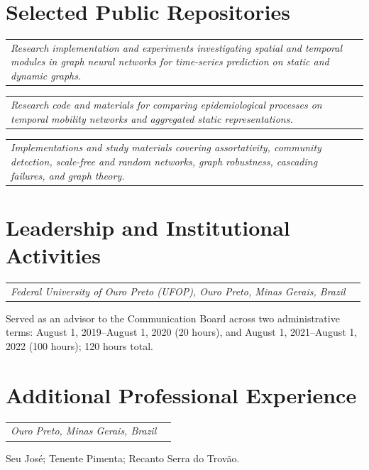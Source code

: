 \documentclass[10pt]{article}
\makeatletter
\newcommand{\proof}[1]{\nobreak\hspace{0.22em}\href{#1}{\textcolor{accent}{\raisebox{0.05ex}{\scriptsize$\nearrow$}}}}
\newcommand{\doclink}[2]{\nobreak\hspace{0.22em}\href{#1}{{\footnotesize\color{accent}[#2]}}}
\newcommand{\REFOPURL}{https://drive.google.com/file/d/1tB2TjGP-zDRyvIGcR2JNQpJjwA1XRZZL/view}
\newcommand{\entry}[3]{%
  \needspace{2.5\baselineskip}%
  \begin{tabularx}{\linewidth}{@{}X>{\raggedleft\arraybackslash}p{2.35cm}@{}}
    \textbf{#1} & {\color{muted}\small #2}\\[-0.08em]
    \multicolumn{2}{@{}p{\linewidth}@{}}{{\itshape #3}}
  \end{tabularx}\par
}
\makeatother
\begin{document}
\section{Selected Public Repositories}

\entry{\href{https://github.com/gabrielxcosta/Spatiotemporal-GNN-Forecasting}{Spatiotemporal GNN Forecasting}\proof{https://github.com/gabrielxcosta/Spatiotemporal-GNN-Forecasting}}{}{Research implementation and experiments investigating spatial and temporal modules in graph neural networks for time-series prediction on static and dynamic graphs.}

\entry{\href{https://github.com/gabrielxcosta/Simulation-of-epidemiological-models-in-temporal-mobility-networks}{Epidemiological Models in Temporal Mobility Networks}\proof{https://github.com/gabrielxcosta/Simulation-of-epidemiological-models-in-temporal-mobility-networks}}{}{Research code and materials for comparing epidemiological processes on temporal mobility networks and aggregated static representations.}

\entry{\href{https://github.com/gabrielxcosta/PCC121---Complex-Networks}{Complex Networks}\proof{https://github.com/gabrielxcosta/PCC121---Complex-Networks}}{}{Implementations and study materials covering assortativity, community detection, scale-free and random networks, graph robustness, cascading failures, and graph theory.}

\section{Leadership and Institutional Activities}

\entry{Communication Board Advisor --- Association of Federal Student Houses of Ouro Preto (REFOP)\doclink{\REFOPURL}{Certificate}}{2019--2020; 2021--2022}{Federal University of Ouro Preto (UFOP), Ouro Preto, Minas Gerais, Brazil}
Served as an advisor to the Communication Board across two administrative terms: August 1, 2019--August 1, 2020 (20 hours), and August 1, 2021--August 1, 2022 (100 hours); 120 hours total.

\section{Additional Professional Experience}

\entry{Freelance Waiter}{}{Ouro Preto, Minas Gerais, Brazil}
Seu José; Tenente Pimenta; Recanto Serra do Trovão.
\end{document}
